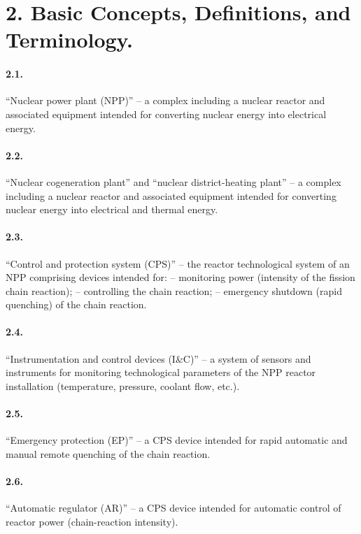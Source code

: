 \documentclass[openright]{bookest}
\begin{document}
\section*{2. Basic Concepts, Definitions, and Terminology.}

\paragraph{2.1.} ``Nuclear power plant (NPP)'' -- a complex including a nuclear reactor and associated equipment intended for converting nuclear energy into electrical energy.

\paragraph{2.2.} ``Nuclear cogeneration plant'' and ``nuclear district-heating plant'' -- a complex including a nuclear reactor and associated equipment intended for converting nuclear energy into electrical and thermal energy.

\paragraph{2.3.} ``Control and protection system (CPS)'' -- the reactor technological system of an NPP comprising devices intended for:
-- monitoring power (intensity of the fission chain reaction);
-- controlling the chain reaction;
-- emergency shutdown (rapid quenching) of the chain reaction.

\paragraph{2.4.} ``Instrumentation and control devices (I\&C)'' -- a system of sensors and instruments for monitoring technological parameters of the NPP reactor installation (temperature, pressure, coolant flow, etc.).

\paragraph{2.5.} ``Emergency protection (EP)'' -- a CPS device intended for rapid automatic and manual remote quenching of the chain reaction.

\paragraph{2.6.} ``Automatic regulator (AR)'' -- a CPS device intended for automatic control of reactor power (chain-reaction intensity).
\end{document}
